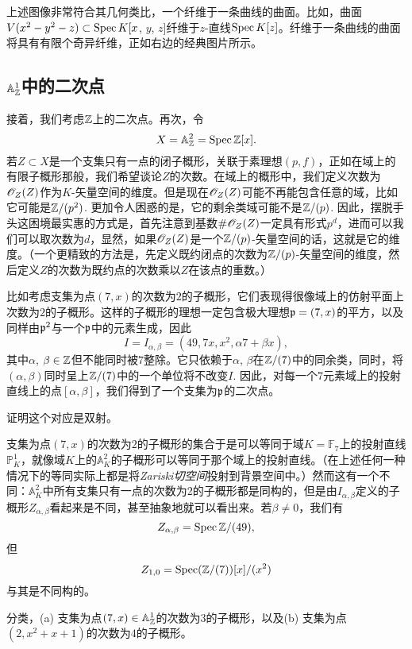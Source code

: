 上述图像非常符合其几何类比，一个纤维于一条曲线的曲面。比如，曲面$V(x^2-y^2-z)\subset \operatorname{Spec} K[x$, $y$, $z]$纤维于$z$-直线$\operatorname{Spec} K[z]$。纤维于一条曲线的曲面将具有有限个奇异纤维，正如右边的经典图片所示。

\subsection{\texorpdfstring{$\mathbb{A}_{\mathbb{Z}}^1$}{AZ1}中的二次点} \label{s:2.4.5}

接着，我们考虑$\mathbb{Z}$上的二次点。再次，令
\[
	X=\mathbb{A}_{\mathbb{Z}}^2=\operatorname{Spec}\mathbb{Z}[x].
\]
若$Z\subset X$是一个支集只有一点的闭子概形，关联于素理想$(p,f)$，正如在域上的有限子概形那般，我们希望谈论$Z$的次数。在域上的概形中，我们定义次数为$\mathscr{O}_Z(Z)$作为$K$\hyp 矢量空间的维度。但是现在$\mathscr{O}_Z(Z)$可能不再能包含任意的域，比如它可能是$\mathbb{Z}/(p^2)$. 更加令人困惑的是，它的剩余类域可能不是$\mathbb{Z}/(p)$. 因此，摆脱手头这困境最实惠的方式是，首先注意到基数$\# \mathscr{O}_Z(Z)$一定具有形式$p^d$，进而可以我们可以取次数为$d$，显然，如果$\mathscr{O}_Z(Z)$是一个$\mathbb{Z}/(p)$\hyp 矢量空间的话，这就是它的维度。（一个更精致的方法是，先定义既约闭点的次数为$\mathbb{Z}/(p)$\hyp 矢量空间的维度，然后定义$Z$的次数为既约点的次数乘以$Z$在该点的重数。）

比如考虑支集为点$(7,x)$的次数为$2$的子概形，它们表现得很像域上的仿射平面上次数为$2$的子概形。这样的子概形的理想一定包含极大理想$\mathfrak{p}=(7,x)$的平方，以及同样由$\mathfrak{p}^2$与一个$\mathfrak{p}$中的元素生成，因此
\[
	I=I_{\alpha,\beta}=(49,7x,x^2,\alpha 7+\beta x),
\]
其中$\alpha$, $\beta\in\mathbb{Z}$但不能同时被$7$整除。它只依赖于$\alpha$, $\beta$在$\mathbb{Z}/(7)$中的同余类，同时，将$(\alpha,\beta)$同时呈上$\mathbb{Z}/(7)$中的一个单位将不改变$I$. 因此，对每一个$7$元素域上的投射直线上的点$[\alpha,\beta]$，我们得到了一个支集为$\mathfrak{p}$的二次点。

\begin{exe}
证明这个对应是双射。
\end{exe}

支集为点$(7,x)$的次数为$2$的子概形的集合于是可以等同于域$K=\mathbb{F}_7$上的投射直线$\mathbb{P}_K^1$，就像域$K$上的$\mathbb{A}_K^2$的子概形可以等同于那个域上的投射直线。（在上述任何一种情况下的等同实际上都是将\textit{Zariski切空间}投射到背景空间中。）然而这有一个不同：$\mathbb{A}_K^2$中所有支集只有一点的次数为$2$的子概形都是同构的，但是由$I_{\alpha,\beta}$定义的子概形$Z_{\alpha,\beta}$看起来是不同，甚至抽象地就可以看出来。若$\beta\neq 0$，我们有
\[
	Z_{\alpha,\beta}=\operatorname{Spec} \mathbb{Z}/(49),
\]
但
\[
	Z_{1,0}=\operatorname{Spec}(\mathbb{Z}/(7))[x]/(x^2)
\]
与其是不同构的。

\begin{exe}
分类，(a) 支集为点$(7,x)\in\mathbb{A}_{\mathbb{Z}}^1$的次数为$3$的子概形，以及(b) 支集为点$(2,x^2+x+1)$的次数为$4$的子概形。
\end{exe}

